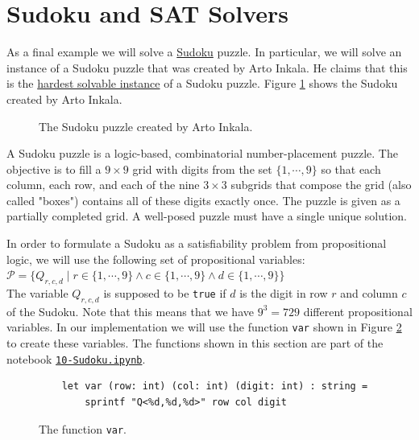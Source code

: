 \pagebreak

\section{Sudoku and SAT Solvers}
As a final example we will solve a \href{https://en.wikipedia.org/wiki/Sudoku}{Sudoku} puzzle.  In particular,
we will solve an instance of a Sudoku puzzle that was created by Arto Inkala.  He claims that this is the
\href{https://abcnews.go.com/blogs/headlines/2012/06/can-you-solve-the-hardest-ever-sudoku}{hardest solvable instance}
of a Sudoku puzzle.  Figure \ref{fig:sudoku.png} shows the Sudoku created by Arto Inkala.

\begin{figure}[!ht]
  \centering
  \caption{The Sudoku puzzle created by Arto Inkala.}
  \label{fig:sudoku.png}
\end{figure}

A Sudoku puzzle is a logic-based, combinatorial number-placement puzzle. The objective is to fill a
$9 \times 9$ grid with digits from the set $\{1, \cdots, 9\}$ so that each column, each row, and each of the
nine $3 \times 3$ subgrids that compose the grid (also called "boxes") contains all of these digits exactly
once.  The puzzle is given as a partially completed grid.  A well-posed puzzle must have a single unique
solution.

In order to formulate a Sudoku as a satisfiability problem from propositional logic, we will use the following
set of propositional variables:
\\[0.2cm]
\hspace*{1.3cm}
$\mathcal{P} = \bigl\{ Q_{r,c,d} \mid r \in \{1,\cdots, 9\} \wedge c \in \{1,\cdots, 9\} \wedge d \in \{1,\cdots, 9\} \bigl\}$
\\[0.2cm]
The variable $Q_{r,c,d}$ is supposed to be \texttt{true} if $d$ is the digit in row $r$ and column $c$ of the
Sudoku.  Note that this means that we have $9^3 = 729$ different propositional variables.  In our
implementation we will use the function \texttt{var} shown in Figure \ref{fig:sudoku-var} to create these variables.
The functions shown in this section are part of the notebook
\href{https://github.com/karlstroetmann/Logic/blob/master/F-Sharp/Chapter-4/10-Sudoku.ipynb}{\texttt{10-Sudoku.ipynb}}.

\begin{figure}[!ht]
\centering
\begin{verbatim}
    let var (row: int) (col: int) (digit: int) : string =
        sprintf "Q<%d,%d,%d>" row col digit
\end{verbatim}
\vspace*{-0.3cm}
\caption{The function \texttt{var}.}
\label{fig:sudoku-var}
\end{figure}

